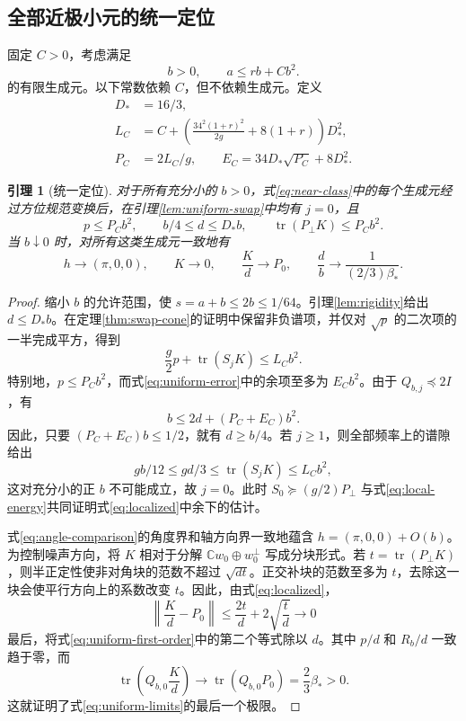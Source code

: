 \documentclass[UTF8,11pt,a4paper,fontset=fandol]{ctexart}
\newtheorem{lemma}[theorem]{引理}
\theoremstyle{definition}
\theoremstyle{remark}
\DeclareMathOperator{\tr}{tr}
\newcommand{\C}{\mathbb C}
\begin{document}
\subsection{全部近极小元的统一定位}
固定 \(C>0\)，考虑满足
\begin{equation}\label{eq:near-class}
 b>0,\qquad a\leq rb+Cb^2.
\end{equation}
的有限生成元。以下常数依赖 \(C\)，但不依赖生成元。定义
\begin{equation}\label{eq:localization-constants}
 \begin{aligned}
 D_*&=16/3,\\
 L_C&=C+\left(\frac{34^2(1+r)^2}{2g}+8(1+r)\right)D_*^2,\\
 P_C&=2L_C/g,\qquad E_C=34D_*\sqrt{P_C}+8D_*^2.
 \end{aligned}
\end{equation}

\begin{lemma}[统一定位]\label{lem:localization}
对于所有充分小的 \(b>0\)，式\eqref{eq:near-class}中的每个生成元经过方位规范变换后，在引理\ref{lem:uniform-swap}中均有 \(j=0\)，且
\begin{equation}\label{eq:localized}
 p\leq P_Cb^2,\qquad b/4\leq d\leq D_*b,\qquad
 \tr(P_\perp K)\leq P_Cb^2.
\end{equation}
当 \(b\downarrow0\) 时，对所有这类生成元一致地有
\begin{equation}\label{eq:uniform-limits}
 h\longrightarrow(\pi,0,0),\qquad
 K\longrightarrow0,\qquad
 \frac Kd\longrightarrow P_0,\qquad
 \frac db\longrightarrow\frac{1}{(2/3)\beta_*}.
\end{equation}
\end{lemma}
\begin{proof}
缩小 \(b\) 的允许范围，使 \(s=a+b\leq2b\leq1/64\)。引理\ref{lem:rigidity}给出 \(d\leq D_*b\)。在定理\ref{thm:swap-cone}的证明中保留非负谱项，并仅对 \(\sqrt p\) 的二次项的一半完成平方，得到
\begin{equation}\label{eq:local-energy}
 \frac g2p+\tr(S_jK)\leq L_Cb^2.
\end{equation}
特别地，\(p\leq P_Cb^2\)，而式\eqref{eq:uniform-error}中的余项至多为 \(E_Cb^2\)。由于 \(Q_{b,j}\preceq2I\)，有
\[
 b\leq2d+(P_C+E_C)b^2.
\]
因此，只要 \((P_C+E_C)b\leq1/2\)，就有 \(d\geq b/4\)。若 \(j\geq1\)，则全部频率上的谱隙给出
\[
 gb/12\leq gd/3\leq\tr(S_jK)\leq L_Cb^2,
\]
这对充分小的正 \(b\) 不可能成立，故 \(j=0\)。此时 \(S_0\succeq(g/2)P_\perp\) 与式\eqref{eq:local-energy}共同证明式\eqref{eq:localized}中余下的估计。

式\eqref{eq:angle-comparison}的角度界和轴方向界一致地蕴含 \(h=(\pi,0,0)+O(b)\)。为控制噪声方向，将 \(K\) 相对于分解 \(\C w_0\oplus w_0^\perp\) 写成分块形式。若 \(t=\tr(P_\perp K)\)，则半正定性使非对角块的范数不超过 \(\sqrt{dt}\)。正交补块的范数至多为 \(t\)，去除这一块会使平行方向上的系数改变 \(t\)。因此，由式\eqref{eq:localized}，
\[
 \left\|\frac Kd-P_0\right\|\leq\frac{2t}{d}+2\sqrt{\frac td}\longrightarrow0
\]
最后，将式\eqref{eq:uniform-first-order}中的第二个等式除以 \(d\)。其中 \(p/d\) 和 \(R_b/d\) 一致趋于零，而
\[
 \tr\left(Q_{b,0}\frac Kd\right)\longrightarrow
 \tr(Q_{b,0}P_0)=\frac23\beta_*>0.
\]
这就证明了式\eqref{eq:uniform-limits}的最后一个极限。
\end{proof}
\end{document}
